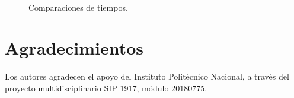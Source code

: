 \documentclass[conference]{IEEEtran}
\begin{document}
  \begin{figure}[!t]
    \centering
    \\
    \caption{Comparaciones de tiempos.}
    \label{fig_sim}
  \end{figure}

  \section*{Agradecimientos}

  Los autores agradecen el apoyo del Instituto Politécnico Nacional, a través del
  proyecto multidisciplinario SIP 1917, módulo 20180775.

  
  
\end{document}
